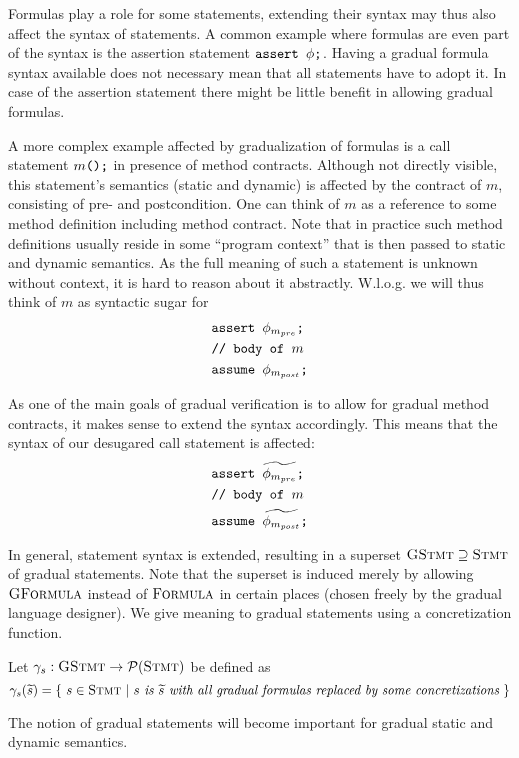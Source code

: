 Formulas play a role for some statements, extending their syntax may thus also affect the syntax of statements.
A common example where formulas are even part of the syntax is the assertion statement $\texttt{assert $\phi$;}$.
Having a gradual formula syntax available does not necessary mean that all statements have to adopt it.
In case of the assertion statement there might be little benefit in allowing gradual formulas.

A more complex example affected by gradualization of formulas is a call statement $\texttt{$m$();}$ in presence of method contracts.
Although not directly visible, this statement's semantics (static and dynamic) is affected by the contract of $m$, consisting of pre- and postcondition.
One can think of $m$ as a reference to some method definition including method contract.
Note that in practice such method definitions usually reside in some “program context” that is then passed to static and dynamic semantics.
As the full meaning of such a statement is unknown without context, it is hard to reason about it abstractly.
W.l.o.g. we will thus think of $m$ as syntactic sugar for 
\begin{align*}
&\texttt{assert $\phi_{m_{pre}}$;}\\
&\texttt{// body of $m$}\\
&\texttt{assume $\phi_{m_{post}}$;}
\end{align*}

As one of the main goals of gradual verification is to allow for gradual method contracts, it makes sense to extend the syntax accordingly.
This means that the syntax of our desugared call statement is affected:
\begin{align*}
&\texttt{assert $\widetilde{\phi_{m_{pre}}}$;}\\
&\texttt{// body of $m$}\\
&\texttt{assume $\widetilde{\phi_{m_{post}}}$;}
\end{align*}

In general, statement syntax is extended, resulting in a superset $\textsc{GStmt} \supseteq \textsc{Stmt}$ of gradual statements.
Note that the superset is induced merely by allowing $\textsc{GFormula}$ instead of $\textsc{Formula}$ in certain places (chosen freely by the gradual language designer).
We give meaning to gradual statements using a concretization function. %
\begin{definition}
    Let $\gamma_s : \textsc{GStmt} \rightarrow \mathcal{P}(\textsc{Stmt})$ be defined as
    \begin{displaymath}
    \gamma_s(\widetilde{s}) = \{~ s \in \textsc{Stmt} ~|~ \textit{$s$ is $\widetilde{s}$ with all gradual formulas replaced by some concretizations} ~\}
    \end{displaymath}
\end{definition}

The notion of gradual statements will become important for gradual static and dynamic semantics.
